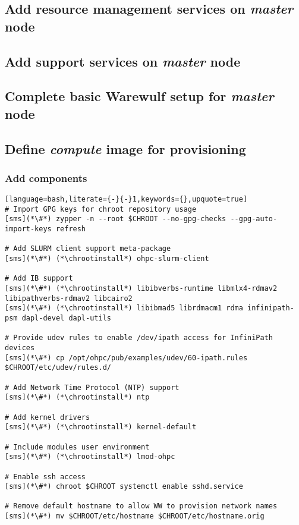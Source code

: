 \documentclass[letterpaper]{article}
\newcommand{\chrootinstall}{zypper -n --root \$CHROOT install}
\begin{document}
\subsection{Add resource management services on {\em master} node} \label{sec:add_rm}


\subsection{Add \InfiniBand{} support services on {\em master} node} \label{sec:add_ofed}


\subsection{Complete basic Warewulf setup for {\em master} node} \label{sec:setup_ww}



\subsection{Define {\em compute} image for provisioning}


\subsubsection{Add \OHPC{} components} \label{sec:add_components}


\begin{lstlisting}[language=bash,literate={-}{-}1,keywords={},upquote=true]
# Import GPG keys for chroot repository usage
[sms](*\#*) zypper -n --root $CHROOT --no-gpg-checks --gpg-auto-import-keys refresh

# Add SLURM client support meta-package
[sms](*\#*) (*\chrootinstall*) ohpc-slurm-client

# Add IB support
[sms](*\#*) (*\chrootinstall*) libibverbs-runtime libmlx4-rdmav2 libipathverbs-rdmav2 libcairo2
[sms](*\#*) (*\chrootinstall*) libibmad5 librdmacm1 rdma infinipath-psm dapl-devel dapl-utils

# Provide udev rules to enable /dev/ipath access for InfiniPath devices
[sms](*\#*) cp /opt/ohpc/pub/examples/udev/60-ipath.rules $CHROOT/etc/udev/rules.d/

# Add Network Time Protocol (NTP) support
[sms](*\#*) (*\chrootinstall*) ntp

# Add kernel drivers
[sms](*\#*) (*\chrootinstall*) kernel-default

# Include modules user environment
[sms](*\#*) (*\chrootinstall*) lmod-ohpc

# Enable ssh access 
[sms](*\#*) chroot $CHROOT systemctl enable sshd.service

# Remove default hostname to allow WW to provision network names
[sms](*\#*) mv $CHROOT/etc/hostname $CHROOT/etc/hostname.orig
\end{lstlisting}
\end{document}
